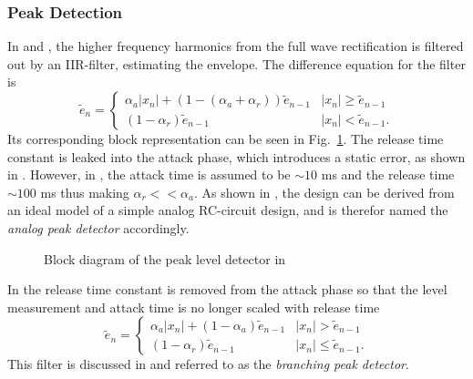 \documentclass[../main2.tex]{subfiles}
\providecommand{\rootdir}{..}
\begin{document}
\subsubsection{Peak Detection}\label{peak_detection}
In \cite{mcnally1984dynamic} and \cite{zolzer1997digital}, the higher frequency harmonics from the full wave rectification is filtered out by an IIR-filter, estimating the envelope. The difference equation for the filter is
\begin{equation}\label{eq:analog_det}
\tilde{e}_n = \begin{cases}
    \alpha_{a} |x_n| + (1- (\alpha_{a} + \alpha_{r})) \tilde{e}_{n-1}  	& |x_n| \geq \tilde{e}_{n-1} \\
    (1-\alpha_{r}) \tilde{e}_{n-1} 							& |x_n| < \tilde{e}_{n-1}.
\end{cases}
\end{equation}
Its corresponding block representation can be seen in Fig.~\ref{fig:block_mcnally_theory_peak}. The release time constant is leaked into the attack phase, which introduces a static error, as shown in \cite{reiss2012tutorial}. However, in \cite{mcnally1984dynamic}, the attack time is assumed to be $\sim 10$ ms and the release time   $\sim 100$ ms thus making $\alpha_r << \alpha_a$. As shown in \cite{reiss2012tutorial}, the design can be derived from an ideal model of a simple analog RC-circuit design, and is therefor named the \emph{analog peak detector} accordingly.
\begin{figure}
\centerline{}
\caption{Block diagram of the peak level detector in \cite{mcnally1984dynamic}}
\label{fig:block_mcnally_theory_peak}
\end{figure}

In \cite{zolzer2008digital} the release time constant is removed from the attack phase so that the level measurement and attack time is no longer scaled with release time
\begin{equation}
\tilde{e}_n = \begin{cases}
    \alpha_{a} |x_n| + (1-\alpha_{a}) \tilde{e}_{n-1} 	& |x_n| > \tilde{e}_{n-1} \\
    (1-\alpha_{r}) \tilde{e}_{n-1} 					& |x_n| \leq \tilde{e}_{n-1}.
\end{cases}
\end{equation}
This filter is discussed in \cite{reiss2012tutorial} and referred to as the \emph{branching peak detector}.
\end{document}
